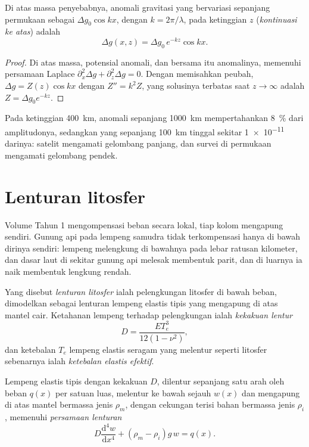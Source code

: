 \begin{proposition}\label{prop:b3:gravity-geodesy:upward}
Di atas massa penyebabnya, anomali gravitasi yang bervariasi sepanjang permukaan
sebagai $\Delta g_0\cos kx$, dengan $k = 2\pi/\lambda$, pada ketinggian $z$ (\emph{kontinuasi
ke atas}) adalah
\[
  \Delta g(x, z) = \Delta g_0\,e^{-kz}\cos kx .
\]
\end{proposition}

\begin{proof}
Di atas massa, potensial anomali, dan bersama itu anomalinya, memenuhi
persamaan Laplace $\partial_x^2\Delta g + \partial_z^2\Delta g = 0$. Dengan memisahkan
peubah, $\Delta g = Z(z)\cos kx$ dengan $Z'' = k^2Z$, yang solusinya terbatas saat
$z \to \infty$ adalah $Z = \Delta g_0e^{-kz}$.
\end{proof}

Pada ketinggian \qty{400}{km}, anomali sepanjang \qty{1000}{km} mempertahankan \qty{8}{\percent}
dari amplitudonya, sedangkan yang sepanjang \qty{100}{km} tinggal sekitar \num{1e-11} darinya:
satelit mengamati gelombang panjang, dan survei di permukaan mengamati gelombang pendek.

\section{Lenturan litosfer}

Volume Tahun 1 mengompensasi beban secara lokal, tiap kolom mengapung sendiri.
Gunung api pada lempeng samudra tidak terkompensasi hanya di bawah dirinya sendiri: lempeng
melengkung di bawahnya pada lebar ratusan kilometer, dan dasar laut
di sekitar gunung api melesak membentuk parit, dan di luarnya ia naik membentuk lengkung rendah.

\begin{definition}\label{def:b3:gravity-geodesy:flexure}
Yang disebut \emph{lenturan litosfer} ialah pelengkungan
litosfer di bawah beban, dimodelkan sebagai lenturan lempeng elastis tipis
yang mengapung di atas mantel cair. Ketahanan lempeng terhadap pelengkungan ialah
\emph{kekakuan lentur}
\[
  D = \frac{ET_e^3}{12(1 - \nu^2)},
\]
dan ketebalan $T_e$ lempeng elastis seragam yang melentur seperti
litosfer sebenarnya ialah \emph{ketebalan elastis efektif}.
\end{definition}

\begin{theorem}\label{thm:b3:gravity-geodesy:plate}
Lempeng elastis tipis dengan kekakuan $D$, dilentur sepanjang satu arah oleh beban $q(x)$
per satuan luas, melentur ke bawah sejauh $w(x)$ dan mengapung di atas mantel bermassa jenis
$\rho_m$, dengan cekungan terisi bahan bermassa jenis $\rho_i$, memenuhi
\emph{persamaan lenturan}
\[
  D\frac{\mathrm d^4w}{\mathrm dx^4} + (\rho_m - \rho_i)g\,w = q(x) .
\]
\end{theorem}

